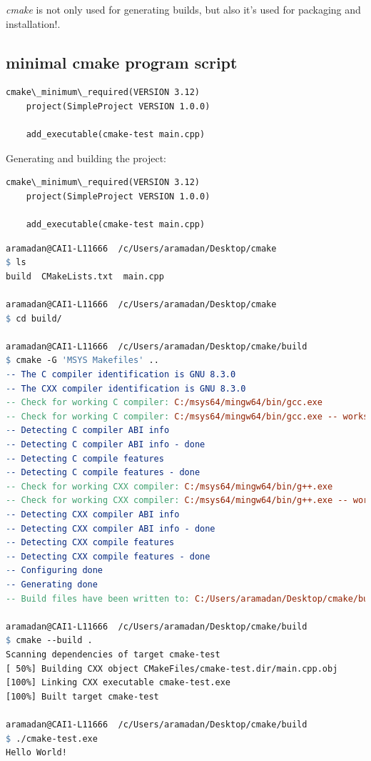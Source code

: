 \documentclass{article}
\begin{document}
\textit{cmake} is not only used for generating builds, but also it's used for packaging and installation!.

\subsection{minimal cmake program script}
\begin{lstlisting}[language=make, caption=Simple cmake script]
    cmake\_minimum\_required(VERSION 3.12)
    project(SimpleProject VERSION 1.0.0)
    
    add_executable(cmake-test main.cpp)
\end{lstlisting}

Generating and building the project:
\begin{lstlisting}[language=make, caption=Simple cmake script]
    cmake\_minimum\_required(VERSION 3.12)
    project(SimpleProject VERSION 1.0.0)
    
    add_executable(cmake-test main.cpp)
\end{lstlisting}

\begin{lstlisting}[language=make, caption=Building a simple cmake]
aramadan@CAI1-L11666  /c/Users/aramadan/Desktop/cmake
$ ls
build  CMakeLists.txt  main.cpp
    
aramadan@CAI1-L11666  /c/Users/aramadan/Desktop/cmake
$ cd build/

aramadan@CAI1-L11666  /c/Users/aramadan/Desktop/cmake/build
$ cmake -G 'MSYS Makefiles' ..
-- The C compiler identification is GNU 8.3.0
-- The CXX compiler identification is GNU 8.3.0
-- Check for working C compiler: C:/msys64/mingw64/bin/gcc.exe
-- Check for working C compiler: C:/msys64/mingw64/bin/gcc.exe -- works
-- Detecting C compiler ABI info
-- Detecting C compiler ABI info - done
-- Detecting C compile features
-- Detecting C compile features - done
-- Check for working CXX compiler: C:/msys64/mingw64/bin/g++.exe
-- Check for working CXX compiler: C:/msys64/mingw64/bin/g++.exe -- works
-- Detecting CXX compiler ABI info
-- Detecting CXX compiler ABI info - done
-- Detecting CXX compile features
-- Detecting CXX compile features - done
-- Configuring done
-- Generating done
-- Build files have been written to: C:/Users/aramadan/Desktop/cmake/build

aramadan@CAI1-L11666  /c/Users/aramadan/Desktop/cmake/build
$ cmake --build .
Scanning dependencies of target cmake-test
[ 50%] Building CXX object CMakeFiles/cmake-test.dir/main.cpp.obj
[100%] Linking CXX executable cmake-test.exe
[100%] Built target cmake-test

aramadan@CAI1-L11666  /c/Users/aramadan/Desktop/cmake/build
$ ./cmake-test.exe
Hello World!
\end{lstlisting}
\end{document}
